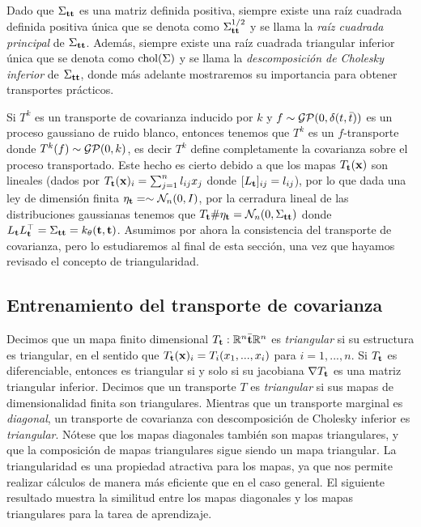 Dado que \(\Sigma_{\mathbf{t}\mathbf{t}}\) es una matriz definida positiva, siempre existe una raíz cuadrada definida positiva única que se denota como \(\Sigma_{\mathbf{t}\mathbf{t}}^{1/2}\) y se llama la \emph{raíz cuadrada principal} de \(\Sigma_{\mathbf{t}\mathbf{t}}\). Además, siempre existe una raíz cuadrada triangular inferior única que se denota como \(\operatorname{chol}(\Sigma)\) y se llama la \emph{descomposición de Cholesky inferior} de \(\Sigma_{\mathbf{t}\mathbf{t}}\), donde más adelante mostraremos su importancia para obtener transportes prácticos.

Si \(T^k\) es un transporte de covarianza inducido por \(k\) y \(f \sim \operatorname{\mathcal{GP}}(0, \delta(t,\bar t))\) es un proceso gaussiano de ruido blanco, entonces tenemos que \(T^k\) es un \(f\)-transporte donde \(T^k(f) \sim \operatorname{\mathcal{GP}}(0, k)\), es decir \(T^k\) define completamente la covarianza sobre el proceso transportado. Este hecho es cierto debido a que los mapas \(T_{\mathbf{t}}(\mathbf{x})\) son lineales (dados por \(T_{\mathbf{t}}(\mathbf{x})_i = \sum_{j=1}^n l_{ij}x_j\) donde \([L_{\mathbf{t}}]_{ij}=l_{ij}\)), por lo que dada una ley de dimensión finita \(\eta_{\mathbf{t}} = \sim \mathcal{N}_n(0,I)\), por la cerradura lineal de las distribuciones gaussianas tenemos que \(T_{\mathbf{t}}\#\eta_{\mathbf{t}} = \mathcal{N}_n(0,\Sigma_{\mathbf{t}\mathbf{t}})\) donde \(L_{\mathbf{t}}L_{\mathbf{t}}^{\top} = \Sigma_{\mathbf{t}\mathbf{t}} = k_{\theta}(\mathbf{t},\mathbf{t})\). Asumimos por ahora la consistencia del transporte de covarianza, pero lo estudiaremos al final de esta sección, una vez que hayamos revisado el concepto de triangularidad.

\subsection{Entrenamiento del transporte de covarianza}

Decimos que un mapa finito dimensional \(T_{\mathbf{t}}: \mathbb{R}^n \bar{\mathbf{t}} \mathbb{R}^n\) es \emph{triangular} si su estructura es triangular, en el sentido que \(T_{\mathbf{t}}(\mathbf{x})_i = T_i(x_1,...,x_i)\) para \(i=1,...,n\). Si \(T_{\mathbf{t}}\) es diferenciable, entonces es triangular si y solo si su jacobiana \(\nabla T_{\mathbf{t}}\) es una matriz triangular inferior. Decimos que un transporte \(T\) es \emph{triangular} si sus mapas de dimensionalidad finita son triangulares. Mientras que un transporte marginal es \emph{diagonal}, un transporte de covarianza con descomposición de Cholesky inferior es \emph{triangular}. Nótese que los mapas diagonales también son mapas triangulares, y que la composición de mapas triangulares sigue siendo un mapa triangular. La triangularidad es una propiedad atractiva para los mapas, ya que nos permite realizar cálculos de manera más eficiente que en el caso general. El siguiente resultado muestra la similitud entre los mapas diagonales y los mapas triangulares para la tarea de aprendizaje.

